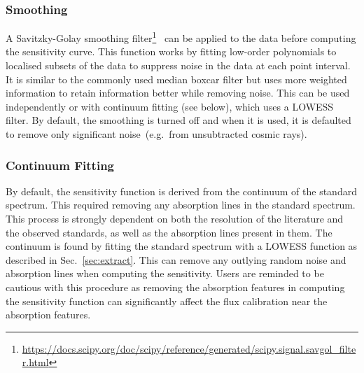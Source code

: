 \documentclass[linenumbers, twocolumn]{aastex631}
\begin{document}
\subsubsection*{Smoothing}
A Savitzky-Golay smoothing
filter\footnote{\url{https://docs.scipy.org/doc/scipy/reference/generated/scipy.signal.savgol_filter.html}}~\citep[hereafter, SG-filter]{1964AnaCh..36.1627S}
can be applied to the data before computing the sensitivity curve. This function
works by fitting low-order polynomials to localised subsets of the data to
suppress noise in the data at each point interval. It is similar to the
commonly used median boxcar filter but uses more weighted information to
retain information better while removing noise. This can be used independently
or with continuum fitting (see below), which uses a LOWESS filter. By default,
the smoothing is turned off and when it is used, it is defaulted to
remove only significant noise~(e.g.\ from unsubtracted cosmic rays).

\subsubsection*{Continuum Fitting}
By default, the sensitivity function is derived from the continuum of the standard spectrum. This required removing any absorption lines in the standard spectrum. This process is strongly dependent on both the
resolution of the literature and the observed standards, as well as the
absorption lines present in them. 
The continuum is found by fitting the standard
spectrum with a LOWESS function as described in Sec.~\ref{sec:extract}. This
can remove any outlying random noise and absorption lines when computing the 
sensitivity. Users are reminded to be cautious with this procedure as removing
the absorption features in computing the sensitivity function can significantly
affect the flux calibration near the absorption features.

\end{document}
